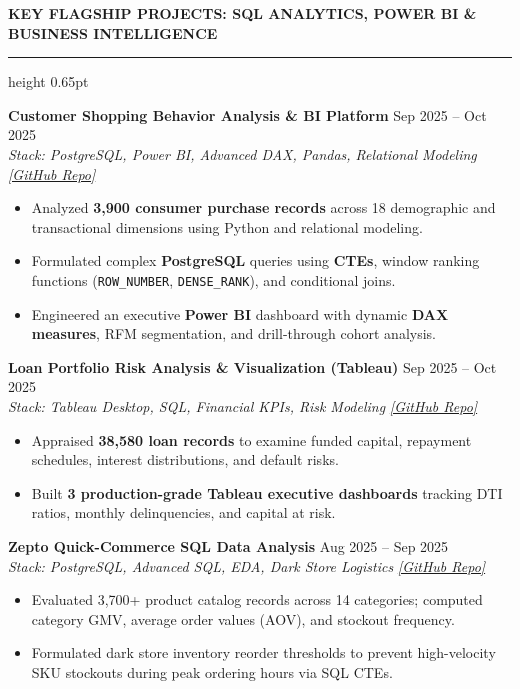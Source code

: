 \documentclass[10pt]{article}
\newcommand{\resumesection}[1]{%
  \vspace{2.5pt}%
  {\large \textbf{\uppercase{#1}}}%
  \vspace{1pt}%
  \hrule height 0.65pt%
  \vspace{2pt}%
}
\begin{document}
\resumesection{Key Flagship Projects: SQL Analytics, Power BI \& Business Intelligence}

\textbf{Customer Shopping Behavior Analysis \& BI Platform} \hfill Sep 2025 -- Oct 2025\\
\textit{Stack: PostgreSQL, Power BI, Advanced DAX, Pandas, Relational Modeling} \hfill \href{https://github.com/Ankitiitk369/Customer-Shoping-Behavior-Data-Analysis-Using-SQL-and-Power-BI}{\textit{[GitHub Repo]}}
\begin{itemize}[noitemsep, topsep=1pt, partopsep=0pt, parsep=0pt]
    \item Analyzed \textbf{3,900 consumer purchase records} across 18 demographic and transactional dimensions using Python and relational modeling.
    \item Formulated complex \textbf{PostgreSQL} queries using \textbf{CTEs}, window ranking functions (\texttt{ROW\_NUMBER}, \texttt{DENSE\_RANK}), and conditional joins.
    \item Engineered an executive \textbf{Power BI} dashboard with dynamic \textbf{DAX measures}, RFM segmentation, and drill-through cohort analysis.
\end{itemize}

\vspace{1pt}

\textbf{Loan Portfolio Risk Analysis \& Visualization (Tableau)} \hfill Sep 2025 -- Oct 2025\\
\textit{Stack: Tableau Desktop, SQL, Financial KPIs, Risk Modeling} \hfill \href{https://github.com/Ankitiitk369/Loan-Portfolio-Risk-Analysis-Visualization-}{\textit{[GitHub Repo]}}
\begin{itemize}[noitemsep, topsep=1pt, partopsep=0pt, parsep=0pt]
    \item Appraised \textbf{38,580 loan records} to examine funded capital, repayment schedules, interest distributions, and default risks.
    \item Built \textbf{3 production-grade Tableau executive dashboards} tracking DTI ratios, monthly delinquencies, and capital at risk.
\end{itemize}

\vspace{1pt}

\textbf{Zepto Quick-Commerce SQL Data Analysis} \hfill Aug 2025 -- Sep 2025\\
\textit{Stack: PostgreSQL, Advanced SQL, EDA, Dark Store Logistics} \hfill \href{https://github.com/Ankitiitk369/Zepto-E-Commerce-SQL-Data-Analysis-}{\textit{[GitHub Repo]}}
\begin{itemize}[noitemsep, topsep=1pt, partopsep=0pt, parsep=0pt]
    \item Evaluated 3,700+ product catalog records across 14 categories; computed category GMV, average order values (AOV), and stockout frequency.
    \item Formulated dark store inventory reorder thresholds to prevent high-velocity SKU stockouts during peak ordering hours via SQL CTEs.
\end{itemize}
\end{document}
